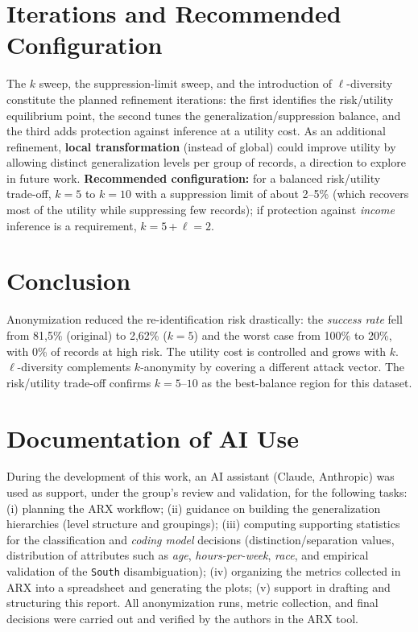 \documentclass[10pt,a4paper]{article}
\begin{document}
\section{Iterations and Recommended Configuration}
The $k$ sweep, the suppression-limit sweep, and the introduction of $\ell$-diversity constitute the planned
refinement iterations: the first identifies the risk/utility equilibrium point, the second tunes the
generalization/suppression balance, and the third adds protection against inference at a utility cost.
As an additional refinement, \textbf{local transformation} (instead of global) could improve utility by allowing
distinct generalization levels per group of records, a direction to explore in future work.
\textbf{Recommended configuration:} for a balanced risk/utility trade-off, $k=5$ to $k=10$ with a suppression
limit of about 2--5\% (which recovers most of the utility while suppressing few records); if protection against
\textit{income} inference is a requirement, $k=5$\,+\,$\ell=2$.

\section{Conclusion}
Anonymization reduced the re-identification risk drastically: the \textit{success rate} fell from 81{,}5\%
(original) to 2{,}62\% ($k=5$) and the worst case from 100\% to 20\%, with 0\% of records at high risk. The
utility cost is controlled and grows with $k$. $\ell$-diversity complements $k$-anonymity by covering a
different attack vector. The risk/utility trade-off confirms $k=5$--$10$ as the best-balance region for this
dataset.

\section*{Documentation of AI Use}
\small
During the development of this work, an AI assistant (Claude, Anthropic) was used as support, under the group's
review and validation, for the following tasks: (i) planning the ARX workflow; (ii) guidance on building the
generalization hierarchies (level structure and groupings); (iii) computing supporting statistics for the
classification and \textit{coding model} decisions (distinction/separation values, distribution of attributes
such as \textit{age}, \textit{hours-per-week}, \textit{race}, and empirical validation of the \texttt{South}
disambiguation); (iv) organizing the metrics collected in ARX into a spreadsheet and generating the plots;
(v) support in drafting and structuring this report. All anonymization runs, metric collection, and final
decisions were carried out and verified by the authors in the ARX tool.
\end{document}

